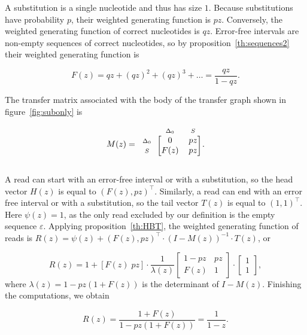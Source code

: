 \documentclass{article}
\newcommand{\smS}{\scriptstyle{S}}
\newcommand{\smDELz}{\scriptstyle{\Delta_0}}
\begin{document}
A substitution is a single nucleotide and thus has size $1$. Because
substitutions have probability $p$, their weighted generating function is
$pz$. Conversely, the weighted generating function of correct nucleotides
is $qz$. Error-free intervals are non-empty sequences of correct
nucleotides, so by proposition~\ref{th:sequences2} their weighted
generating function is

\begin{equation}
\label{eq:Fsub}
F(z) = qz + (qz)^2 + (qz)^3 + \ldots = \frac{qz}{1-qz}.
\end{equation}

The transfer matrix associated with the body of the transfer graph shown
in figure~\ref{fig:subonly} is

\begin{equation*}
M(z) = 
\begin{blockarray}{ccc}
       & \smDELz & \smS \\
\begin{block}{c[cc]}
\smDELz & 0    & pz \\
\smS    & F(z) & pz \\
\end{block}
\end{blockarray}.
\end{equation*}


A read can start with an error-free interval or with a substitution, so
the head vector $H(z)$ is equal to $(F(z), pz)^\top$. Similarly, a read
can end with an error free interval or with a substitution, so the tail
vector $T(z)$ is equal to $(1,1)^\top$. Here $\psi(z) = 1$, as the only
read excluded by our definition is the empty sequence $\varepsilon$.
Applying proposition~\ref{th:HBT}, the weighted generating function of
reads is $R(z) = \psi(z) + (F(z), pz)^\top \cdot (I-M(z))^{-1} \cdot
T(z)$, or

\begin{equation*}
R(z) = 1 + [F(z) \; pz] \cdot
\frac{1}{\lambda(z)}
\begin{bmatrix}
1-pz & pz   \\
F(z) & 1
\end{bmatrix}
\cdot \begin{bmatrix}1 \\ 1\end{bmatrix},
\end{equation*}
where $\lambda(z) = 1-pz(1+F(z))$ is the determinant of $I-M(z)$.
Finishing the computations, we obtain

\begin{equation}
\label{eq:Rsub}
R(z) = \frac{1+F(z)}{1-pz(1+F(z))} = \frac{1}{1-z}.
\end{equation}
\end{document}
